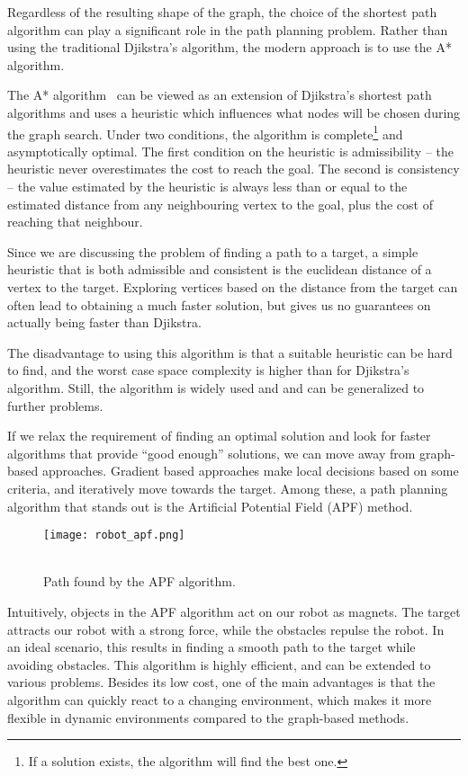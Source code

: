Regardless of the resulting shape of the graph, the choice of the shortest path algorithm can play a significant role in the path planning problem. Rather than using the traditional Djikstra's algorithm, the modern approach is to use the A* algorithm.

The A* algorithm~\cite{ai_modern} can be viewed as an extension of Djikstra's shortest path algorithms and uses a heuristic which influences what nodes will be chosen during the graph search. Under two conditions, the algorithm is complete\footnote{If a solution exists, the algorithm will find the best one.} and asymptotically optimal. The first condition on the heuristic is admissibility -- the heuristic never overestimates the cost to reach the goal. The second is consistency -- the value estimated by the heuristic is always less than or equal to the estimated distance from any neighbouring vertex to the goal, plus the cost of reaching that neighbour.

Since we are discussing the problem of finding a path to a target, a simple heuristic that is both admissible and consistent is the euclidean distance of a vertex to the target. Exploring vertices based on the distance from the target can often lead to obtaining a much faster solution, but gives us no guarantees on actually being faster than Djikstra.

The disadvantage to using this algorithm is that a suitable heuristic can be hard to find, and the worst case space complexity is higher than for Djikstra's algorithm. Still, the algorithm is widely used and and can be generalized to further problems.

\newpage
If we relax the requirement of finding an optimal solution and look for faster algorithms that provide \enquote{good enough} solutions, we can move away from graph-based approaches. Gradient based approaches make local decisions based on some criteria, and iteratively move towards the target. Among these, a path planning algorithm that stands out is the Artificial Potential Field (APF) method.

\begin{wrapfigure}{r}{0.33\textwidth}
    \centering
    \texttt{[image: robot\_apf.png]}
  \caption{\\Path found by the APF algorithm.}\label{fig:apf}
\end{wrapfigure}

Intuitively, objects in the APF algorithm act on our robot as magnets. The target attracts our robot with a strong force, while the obstacles repulse the robot. In an ideal scenario, this results in finding a smooth path to the target while avoiding obstacles. This algorithm is highly efficient, and can be extended to various problems. Besides its low cost, one of the main advantages is that the algorithm can quickly react to a changing environment, which makes it more flexible in dynamic environments compared to the graph-based methods.

